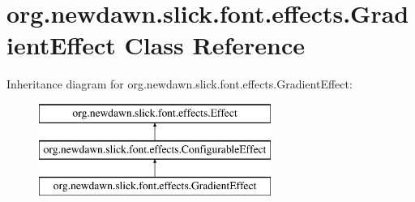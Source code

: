 \hypertarget{classorg_1_1newdawn_1_1slick_1_1font_1_1effects_1_1_gradient_effect}{}\section{org.\+newdawn.\+slick.\+font.\+effects.\+Gradient\+Effect Class Reference}
\label{classorg_1_1newdawn_1_1slick_1_1font_1_1effects_1_1_gradient_effect}
Inheritance diagram for org.\+newdawn.\+slick.\+font.\+effects.\+Gradient\+Effect\+:\begin{figure}[H]
\begin{center}
\leavevmode
\includegraphics[height=3.000000cm]{classorg_1_1newdawn_1_1slick_1_1font_1_1effects_1_1_gradient_effect}
\end{center}
\end{figure}
